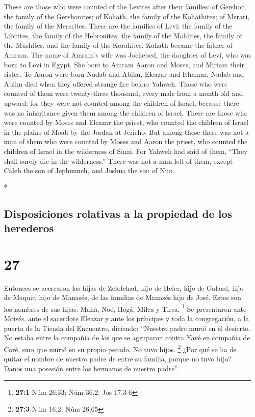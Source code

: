 \begin{paracol}{2}
\begin{otherlanguage}{english}
 These are those who were counted of the Levites after
their families: of Gershon, the family of the Gershonites; of Kohath,
the family of the Kohathites; of Merari, the family of the Merarites.
 These are the families of Levi: the family of the
Libnites, the family of the Hebronites, the family of the Mahlites, the
family of the Mushites, and the family of the Korahites. Kohath became
the father of Amram.  The name of Amram's wife was
Jochebed, the daughter of Levi, who was born to Levi in Egypt. She bore
to Amram Aaron and Moses, and Miriam their sister.  To
Aaron were born Nadab and Abihu, Eleazar and Ithamar. 
Nadab and Abihu died when they offered strange fire before Yahweh.
 Those who were counted of them were twenty-three
thousand, every male from a month old and upward; for they were not
counted among the children of Israel, because there was no inheritance
given them among the children of Israel.  These are those
who were counted by Moses and Eleazar the priest, who counted the
children of Israel in the plains of Moab by the Jordan at Jericho.
 But among these there was not a man of them who were
counted by Moses and Aaron the priest, who counted the children of
Israel in the wilderness of Sinai.  For Yahweh had said
of them, ``They shall surely die in the wilderness.'' There was not a
man left of them, except Caleb the son of Jephunneh, and Joshua the son
of Nun.

\end{otherlanguage}

\switchcolumn[0]*

\hypertarget{disposiciones-relativas-a-la-propiedad-de-los-herederos}{%
\subsection{Disposiciones relativas a la propiedad de los
herederos}\label{disposiciones-relativas-a-la-propiedad-de-los-herederos}}

\hypertarget{section-52}{%
\section{27}\label{section-52}}

 Entonces se acercaron las hijas de Zelofehad, hijo de
Hefer, hijo de Galaad, hijo de Maquir, hijo de Manasés, de las familias
de Manasés hijo de José. Estos son los nombres de sus hijas: Mahá, Noé,
Hogá, Milca y Tirsa. \footnote{\textbf{27:1} Núm 26,33; Núm 36,2; Jos
  17,3-6}  Se presentaron ante Moisés, ante el sacerdote
Eleazar y ante los príncipes y toda la congregación, a la puerta de la
Tienda del Encuentro, diciendo:  ``Nuestro padre murió en
el desierto. No estaba entre la compañía de los que se agruparon contra
Yavé en compañía de Coré, sino que murió en su propio pecado. No tuvo
hijos. \footnote{\textbf{27:3} Núm 16,2; Núm 26,65}  ¿Por
qué se ha de quitar el nombre de nuestro padre de entre su familia,
porque no tuvo hijo? Danos una posesión entre los hermanos de nuestro
padre''.


\end{paracol}
